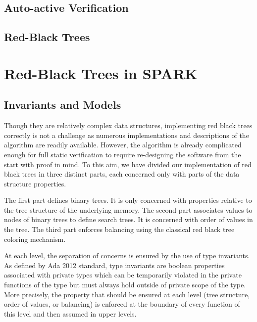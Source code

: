 \documentclass[11pt,a4paper]{article}
\begin{document}
\subsection{Auto-active Verification}
\subsection{Red-Black Trees}

\section{Red-Black Trees in SPARK}
\subsection{Invariants and Models}
\label{sec-rbt-inv}


Though they are relatively complex data structures, implementing red black trees
correctly is not a challenge as numerous implementations and descriptions of the
algorithm are readily available. However, the algorithm is already complicated
enough for full static verification to require re-designing the
software from the start with proof in mind.
To this aim, we have divided our implementation of red black trees in three
distinct parts, each concerned only with parts of the data structure properties.

The first part defines binary trees. It is only concerned with properties
relative to the tree structure of the underlying memory.
The second part associates values to nodes of binary trees to define search trees.
It is concerned with order of values in the tree.
The third part enforces balancing using the classical red black tree coloring
mechanism.

At each level, the separation of concerns is ensured by the use of type invariants.
As defined by Ada 2012 standard, type invariants are boolean properties associated
with private types which can be temporarily violated in the private functions of the
type but must always hold outside of private scope of the type.
More precisely, the property that should be ensured at each level (tree structure,
order of values, or balancing) is enforced at the boundary of every function
of this level and then assumed in upper levels.
\end{document}
